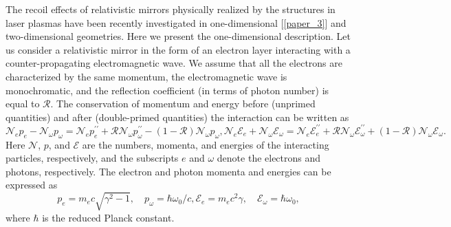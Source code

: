 \documentclass[10pt, a4paper, twoside, openright]{report}
\begin{document}
The recoil effects of relativistic mirrors physically realized by the structures in laser plasmas have been recently investigated in one-dimensional [\ref{paper_3}] and two-dimensional \cite{Jeong2021} geometries. Here we present the one-dimensional description. Let us consider a relativistic mirror in the form of an electron layer interacting with a counter-propagating electromagnetic wave. We assume that all the electrons are characterized by the same momentum, the electromagnetic wave is monochromatic, and the reflection coefficient (in terms of photon number) is equal to $ \mathcal{R} $. The conservation of momentum and energy before (unprimed quantities) and after (double-primed quantities) the interaction can be written as
\begin{subequations}\label{eq:conservation}
\begin{equation}\label{eq:conservation_of_momentum}
\mathcal{N}_e p_e - \mathcal{N}_{\omega} p_{\omega} = \mathcal{N}_e p_e^{\prime \prime} + \mathcal{R} \mathcal{N}_{\omega} p_{\omega}^{\prime \prime} - \left( 1 - \mathcal{R} \right) \mathcal{N}_{\omega} p_{\omega},
\end{equation}
\begin{equation}\label{eq:conservation_of_energy}
\mathcal{N}_e \mathcal{E}_e + \mathcal{N}_{\omega} \mathcal{E}_{\omega} = \mathcal{N}_e \mathcal{E}_e^{\prime \prime} + \mathcal{R} \mathcal{N}_{\omega} \mathcal{E}_{\omega}^{\prime \prime} + \left( 1 - \mathcal{R} \right) \mathcal{N}_{\omega}  \mathcal{E}_{\omega}.
\end{equation}
\end{subequations}
Here $ \mathcal{N} $, $ p $, and $ \mathcal{E} $ are the numbers, momenta, and energies of the interacting particles, respectively, and the subscripts $ e $ and $ \omega $ denote the electrons and photons, respectively. The electron and photon momenta and energies can be expressed as
\begin{subequations}\label{eq:electron_and_photon_momentum_and_energy}
\begin{equation}\label{eq:electron_and_photon_momentum}
p_e = m_e c \sqrt{\gamma^2 - 1}, \quad p_{\omega} = \hbar \omega_0 / c,
\end{equation}
\begin{equation}\label{eq:electron_and_photon_energy}
\mathcal{E}_e = m_e c^2 \gamma, \quad \mathcal{E}_{\omega} = \hbar \omega_0,
\end{equation}
\end{subequations}
where $ \hbar $ is the reduced Planck constant.
\end{document}
